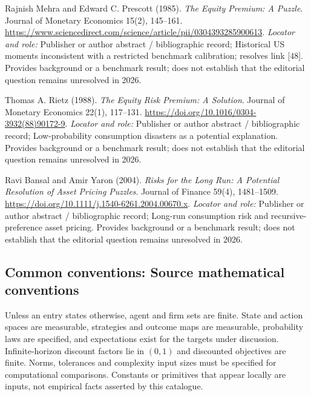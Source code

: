 \documentclass[11pt,a4paper]{article}
\begin{document}
\begin{enumerate}[label={[S\arabic*]},leftmargin=*]

\item Rajnish Mehra and Edward C. Prescott (1985). \emph{The Equity Premium: A Puzzle}. Journal of Monetary Economics 15(2), 145–161. \url{https://www.sciencedirect.com/science/article/pii/0304393285900613}.
\textit{Locator and role:} Publisher or author abstract / bibliographic record; Historical US moments inconsistent with a restricted benchmark calibration; resolves link [48]. Provides background or a benchmark result; does not establish that the editorial question remains unresolved in 2026.

\item Thomas A. Rietz (1988). \emph{The Equity Risk Premium: A Solution}. Journal of Monetary Economics 22(1), 117–131. \url{https://doi.org/10.1016/0304-3932(88)90172-9}.
\textit{Locator and role:} Publisher or author abstract / bibliographic record; Low-probability consumption disasters as a potential explanation. Provides background or a benchmark result; does not establish that the editorial question remains unresolved in 2026.

\item Ravi Bansal and Amir Yaron (2004). \emph{Risks for the Long Run: A Potential Resolution of Asset Pricing Puzzles}. Journal of Finance 59(4), 1481–1509. \url{https://doi.org/10.1111/j.1540-6261.2004.00670.x}.
\textit{Locator and role:} Publisher or author abstract / bibliographic record; Long-run consumption risk and recursive-preference asset pricing. Provides background or a benchmark result; does not establish that the editorial question remains unresolved in 2026.

\end{enumerate}

\subsection*{Common conventions: Source mathematical conventions}

Unless an entry states otherwise, agent and firm sets are finite. State and action spaces are measurable, strategies and outcome maps are measurable, probability laws are specified, and expectations exist for the targets under discussion. Infinite-horizon discount factors lie in $(0,1)$ and discounted objectives are finite. Norms, tolerances and complexity input sizes must be specified for computational comparisons. Constants or primitives that appear locally are inputs, not empirical facts asserted by this catalogue.
\end{document}
